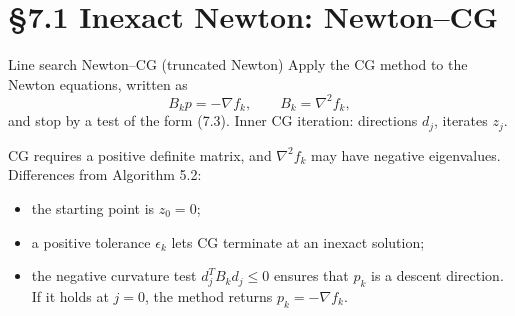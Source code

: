 \documentclass[aspectratio=169,12pt]{beamer}
\newcommand{\gradf}{\nabla f}
\newcommand{\hessf}{\nabla^{2} f}
\begin{document}
\section{\S7.1 Inexact Newton: Newton--CG}

\begin{frame}{Line search Newton--CG (truncated Newton)}
  Apply the CG method to the Newton equations, written as
  \[ B_{k}p=-\gradf_{k},\qquad B_{k}=\hessf_{k}, \tag{7.9} \]
  and stop by a test of the form (7.3). Inner CG iteration: directions $d_{j}$, iterates $z_{j}$.

  \vspace{0.3em}
  CG requires a positive definite matrix, and $\hessf_{k}$ may have negative eigenvalues.
  Differences from Algorithm 5.2:
  \begin{itemize}\setlength\itemsep{0.3em}
    \item the starting point is $z_{0}=0$;
    \item a positive tolerance $\epsilon_{k}$ lets CG terminate at an inexact solution;
    \item the \alert{negative curvature test} $d_{j}^{T}B_{k}d_{j}\le 0$ ensures that $p_{k}$ is a descent
      direction. If it holds at $j=0$, the method returns $p_{k}=-\gradf_{k}$.
  \end{itemize}
\end{frame}
\end{document}
